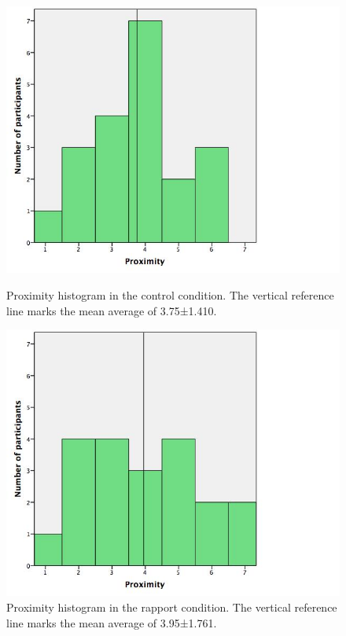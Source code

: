 \begin{figure}[H]
	\centering
	\hspace{10mm}
	\begin{minipage}[b]{.45\textwidth}
		\centering
		\includegraphics[width=\textwidth]{images/EmysBaseline.jpeg}
		\caption{Proximity histogram in the control condition. The vertical reference line marks the mean average of 3.75±1.410.}
		\label{fig:proximity_baseline}
	\end{minipage}
	\hfill
	\begin{minipage}[b]{.45\textwidth}
		\centering
		\includegraphics[width=\textwidth]{images/EmysRapport.jpeg}
		\caption{Proximity histogram in the rapport condition. The vertical reference line marks the mean average of 3.95±1.761.}
		\label{fig:proximity_rapport}
	\end{minipage}
\end{figure}

